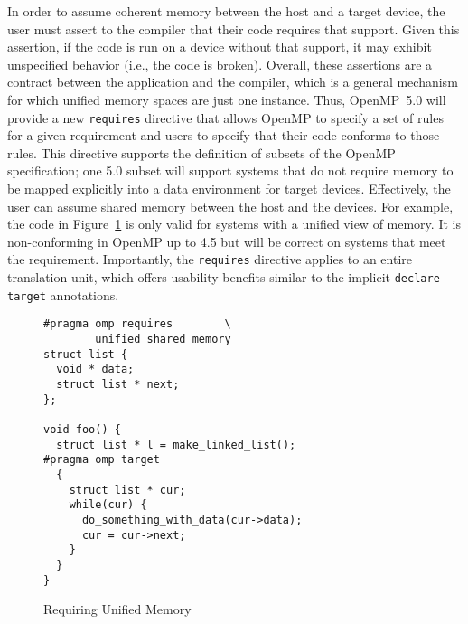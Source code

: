 In order to assume coherent memory between the host and a target device, 
the user must assert to the compiler that their code requires that support.
Given this assertion, if the code is run on a device without that support, 
it may exhibit unspecified behavior (i.e., the code is broken). Overall,
these assertions are a contract between the application and the compiler, 
which is a general mechanism for which unified memory spaces are just one 
instance. Thus, OpenMP~5.0 will provide a new \texttt{requires} directive 
that allows OpenMP to specify a set of rules for a given requirement and 
users to specify that their code conforms to those rules. This directive 
supports the definition of subsets of the OpenMP specification; one 5.0
subset will support systems that do not require memory to be mapped explicitly
into a data environment for target devices. Effectively, the user can assume 
shared memory between the host and the devices. For example, the code in 
Figure~\ref{fig:unified} is only valid for systems with a unified view of 
memory. It is non-conforming in OpenMP up to 4.5 but will be correct on 
systems that meet the requirement. Importantly, the \texttt{requires} 
directive applies to an entire translation unit, which offers usability 
benefits similar to the implicit \texttt{declare target} annotations.

\begin{figure}
\begin{verbatim}
#pragma omp requires        \
        unified_shared_memory
struct list {
  void * data;
  struct list * next;
};

void foo() {
  struct list * l = make_linked_list();
#pragma omp target
  {
    struct list * cur;
    while(cur) {
      do_something_with_data(cur->data);
      cur = cur->next;
    }
  }
}
\end{verbatim}
\caption{Requiring Unified Memory\label{fig:unified}}
\end{figure}

